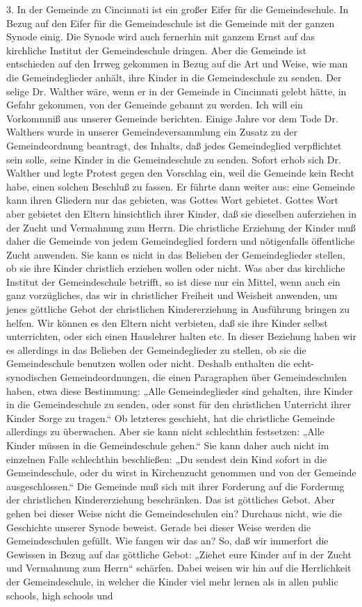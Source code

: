 3. In der Gemeinde zu Cincinnati ist ein großer Eifer für die Gemeindeschule. In Bezug auf den Eifer für die Gemeindeschule ist die Gemeinde mit der ganzen Synode einig. Die Synode wird auch fernerhin mit ganzem Ernst auf das kirchliche Institut der Gemeindeschule dringen. Aber die Gemeinde ist entschieden auf den Irrweg gekommen in Bezug auf die Art und Weise, wie man die Gemeindeglieder anhält, ihre Kinder in die Gemeindeschule zu senden. Der selige Dr. Walther wäre, wenn er in der Gemeinde in Cincinnati gelebt hätte, in Gefahr gekommen, von der Gemeinde gebannt zu werden. Ich will ein Vorkommniß aus unserer Gemeinde berichten. Einige Jahre vor dem Tode Dr. Walthers wurde in unserer Gemeindeversammlung ein Zusatz zu der Gemeindeordnung beantragt, des Inhalts, daß jedes Gemeindeglied verpflichtet sein solle, seine Kinder in die Gemeindeschule zu senden. Sofort erhob sich Dr. Walther und legte Protest gegen den Vorschlag ein, weil die Gemeinde kein Recht habe, einen solchen Beschluß zu fassen. Er führte dann weiter aus: eine Gemeinde kann ihren Gliedern nur das gebieten, was Gottes Wort gebietet. Gottes Wort aber gebietet den Eltern hinsichtlich ihrer Kinder, daß sie dieselben auferziehen in der Zucht und Vermahnung zum Herrn. Die christliche Erziehung der Kinder muß daher die Gemeinde von jedem Gemeindeglied fordern und nötigenfalls öffentliche Zucht anwenden. Sie kann es nicht in das Belieben der Gemeindeglieder stellen, ob sie ihre Kinder christlich erziehen wollen oder nicht. Was aber das kirchliche Institut der Gemeindeschule betrifft, so ist diese nur ein Mittel, wenn auch ein ganz vorzügliches, das wir in christlicher Freiheit und Weisheit anwenden, um jenes göttliche Gebot der christlichen Kindererziehung in Ausführung bringen zu helfen. Wir können es den Eltern nicht verbieten, daß sie ihre Kinder selbst unterrichten, oder sich einen Hauslehrer halten etc. In dieser Beziehung haben wir es allerdings in das Belieben der Gemeindeglieder zu stellen, ob sie die Gemeindeschule benutzen wollen oder nicht. Deshalb enthalten die echt-synodischen Gemeindeordnungen, die einen Paragraphen über Gemeindeschulen haben, etwa diese Bestimmung: „Alle Gemeindeglieder sind gehalten, ihre Kinder in die Gemeindeschule zu senden, oder sonst für den christlichen Unterricht ihrer Kinder Sorge zu tragen.“ Ob letzteres geschieht, hat die christliche Gemeinde allerdings zu überwachen. Aber sie kann nicht schlechthin festsetzen: „Alle Kinder müssen in die Gemeindeschule gehen.“ Sie kann daher auch nicht im einzelnen Falle schlechthin beschließen: „Du sendest dein Kind sofort in die Gemeindeschule, oder du wirst in Kirchenzucht genommen und von der Gemeinde ausgeschlossen.“ Die Gemeinde muß sich mit ihrer Forderung auf die Forderung der christlichen Kindererziehung beschränken. Das ist göttliches Gebot. Aber gehen bei dieser Weise nicht die Gemeindeschulen ein? Durchaus nicht, wie die Geschichte unserer Synode beweist. Gerade bei dieser Weise werden die Gemeindeschulen gefüllt. Wie fangen wir das an? So, daß wir immerfort die Gewissen in Bezug auf das göttliche Gebot: „Ziehet eure Kinder auf in der Zucht und Vermahnung zum Herrn“ schärfen. Dabei weisen wir hin auf die Herrlichkeit der Gemeindeschule, in welcher die Kinder viel mehr lernen als in allen public schools, high schools und 